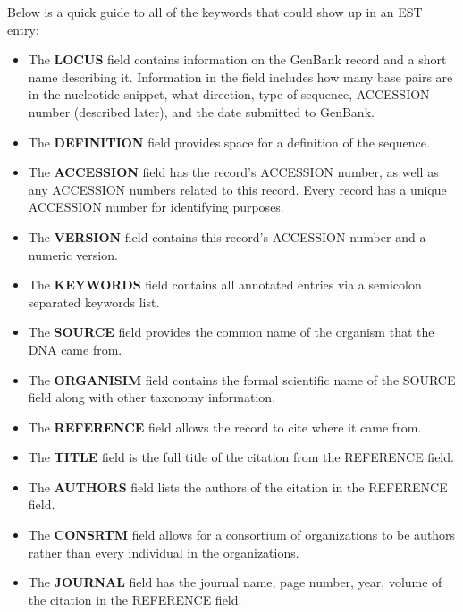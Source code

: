 \documentclass[12pt]{ucthesis}
\begin{document}
Below is a quick guide to all of the keywords that could show up in an EST entry:
\begin{itemize}
\item The \textbf{LOCUS} field contains information on the GenBank record and a short 
name describing it. Information in the field includes how many base pairs are in the nucleotide snippet, what direction, type of sequence, ACCESSION number (described later), and the date submitted to GenBank.

\item The \textbf{DEFINITION} field provides space for a definition of the sequence.

\item The \textbf{ACCESSION} field has the record's ACCESSION number, as well as any 
ACCESSION numbers related to this record. Every record has a unique ACCESSION number for identifying purposes.

\item The \textbf{VERSION} field contains this record's ACCESSION 
number and a numeric version. 

\item The \textbf{KEYWORDS} field contains all annotated entries via a semicolon separated keywords list.

\item The \textbf{SOURCE} field provides the common name of the organism that the DNA came from.

\item The \textbf{ORGANISIM} field contains the formal scientific name of the SOURCE field along with other taxonomy information.

\item The \textbf{REFERENCE} field allows the record to cite where it came from. 

\item The \textbf{TITLE} field is the full title of the citation from the REFERENCE field.

\item The \textbf{AUTHORS} field lists the authors of the citation in the REFERENCE field.

\item The \textbf{CONSRTM} field allows for a consortium of organizations to be authors rather than every individual in the organizations.

\item The \textbf{JOURNAL} field has the journal name, page number, year, volume of
the citation in the REFERENCE field.


\end{itemize}
\end{document}
